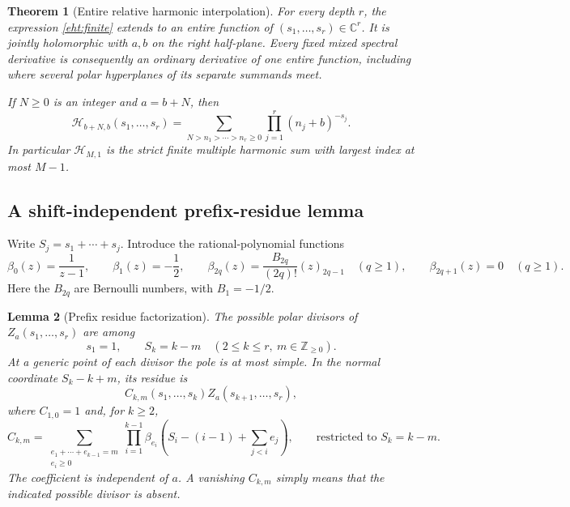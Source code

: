 \documentclass[11pt]{article}
\numberwithin{equation}{section}
\theoremstyle{plain}
\newtheorem{theorem}{Theorem}[section]
\newtheorem{lemma}[theorem]{Lemma}
\theoremstyle{definition}
\theoremstyle{remark}
\begin{document}
\begin{theorem}[Entire relative harmonic interpolation]\label{eht:main}
For every depth $r$, the expression \eqref{eht:finite} extends to an
entire function of $(s_1,\ldots,s_r)\in\mathbb C^r$.  It is jointly
holomorphic with $a,b$ on the right half-plane.  Every fixed mixed spectral
derivative is consequently an ordinary derivative of one entire function,
including where several polar hyperplanes of its separate summands meet.

If $N\ge0$ is an integer and $a=b+N$, then
\begin{equation}\label{eht:interval}
 \boxed{\mathcal H_{b+N,b}(s_1,\ldots,s_r)=
  \sum_{N>n_1>\cdots>n_r\ge0}
              \prod_{j=1}^r(n_j+b)^{-s_j}.}
\end{equation}
In particular $\mathcal H_{M,1}$ is the strict finite multiple harmonic
sum with largest index at most $M-1$.
\end{theorem}

\subsection{A shift-independent prefix-residue lemma}

Write $S_j=s_1+\cdots+s_j$.  Introduce the rational-polynomial functions
\begin{equation}\label{eht:beta}
 \beta_0(z)=\frac1{z-1},\qquad
 \beta_1(z)=-\frac12,\qquad
 \beta_{2q}(z)=\frac{B_{2q}}{(2q)!}(z)_{2q-1}\quad(q\ge1),
 \qquad \beta_{2q+1}(z)=0\quad(q\ge1).
\end{equation}
Here the $B_{2q}$ are Bernoulli numbers, with $B_1=-1/2$.

\begin{lemma}[Prefix residue factorization]\label{eht:residue}
The possible polar divisors of $Z_a(s_1,\ldots,s_r)$ are among
\[
 s_1=1,\qquad S_k=k-m\quad(2\le k\le r,\ m\in\mathbb Z_{\ge0}).
\]
At a generic point of each divisor the pole is at most simple.  In the
normal coordinate $S_k-k+m$, its residue is
\begin{equation}\label{eht:resfactor}
 C_{k,m}(s_1,\ldots,s_k)Z_a(s_{k+1},\ldots,s_r),
\end{equation}
where $C_{1,0}=1$ and, for $k\ge2$,
\begin{equation}\label{eht:C}
 C_{k,m}=
 \sum_{\substack{e_1+\cdots+e_{k-1}=m\\e_i\ge0}}
 \prod_{i=1}^{k-1}
 \beta_{e_i}\left(S_i-(i-1)+\sum_{j<i}e_j\right),
 \qquad\text{restricted to }S_k=k-m.
\end{equation}
The coefficient is independent of $a$.  A vanishing $C_{k,m}$ simply means
that the indicated possible divisor is absent.
\end{lemma}
\end{document}
